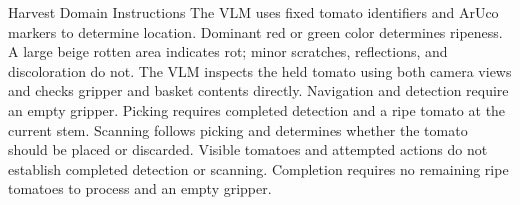 \begin{vlmpromptbox}{Harvest Domain Instructions}
The VLM uses fixed tomato identifiers and ArUco markers to determine location. Dominant red or green color determines ripeness. A large beige rotten area indicates rot; minor scratches, reflections, and discoloration do not. The VLM inspects the held tomato using both camera views and checks gripper and basket contents directly. Navigation and detection require an empty gripper. Picking requires completed detection and a ripe tomato at the current stem. Scanning follows picking and determines whether the tomato should be placed or discarded. Visible tomatoes and attempted actions do not establish completed detection or scanning. Completion requires no remaining ripe tomatoes to process and an empty gripper.
\end{vlmpromptbox}
